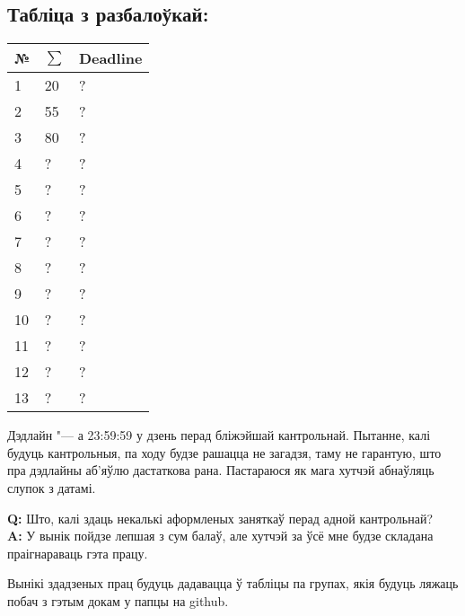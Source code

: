 \documentclass[12pt, a4paper]{extarticle}
\newcommand{\formQA}[2]{%
	\noindent \textbf{Q:} #1 \\
	\textbf{A:} #2
}
\begin{document}
	\subsection{Табліца з разбалоўкай:}
	\begin{table}[H]
		\begin{center}
			\begin{tabular}{|l|l|l|}
				\hline
				\bf №  & $\sum$ & \bf Deadline  \\ \hline
				1    & 20 & ? \\ \hline
				2   & 55 & ? \\ \hline
				3   & 80 & ? \\ \hline
				4   & ? & ?  \\ \hline
				5   & ? & ?  \\ \hline
				6   & ? & ?  \\ \hline
				7   & ? & ?  \\ \hline
				8   & ? & ?  \\ \hline
				9   & ? & ?  \\ \hline
				10   & ? & ?  \\ \hline
				11   & ? & ?  \\ \hline
				12   & ? & ?  \\ \hline
				13   & ? & ?  \\ \hline
			\end{tabular}
		\end{center}
	\end{table}
	
	Дэдлайн "--- а 23:59:59 у дзень перад бліжэйшай кантрольнай. Пытанне, калі будуць кантрольныя, па ходу будзе рашацца не загадзя, таму не гарантую, што пра дэдлайны аб'яўлю дастаткова рана. Пастараюся як мага хутчэй абнаўляць слупок з датамі.
	
	\formQA{Што, калі здаць некалькі аформленых заняткаў перад адной кантрольнай?}
	{У вынік пойдзе лепшая з сум балаў, але хутчэй за ўсё мне будзе складана праігнараваць гэта працу.}
	
	Вынікі здадзеных прац будуць дадавацца ў табліцы па групах, якія будуць ляжаць побач з гэтым докам у папцы на github.
\end{document}
